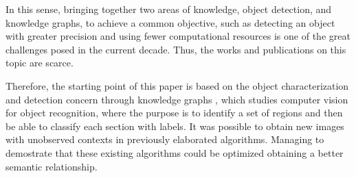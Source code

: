 In this sense, bringing together two areas of knowledge, object detection, and 
knowledge graphs, to achieve a common objective, such as detecting an object 
with greater precision and using fewer computational resources is one of the 
great challenges posed in the current decade. Thus, the works and 
publications on this topic are scarce.

Therefore, the starting point of this paper is based on the object 
characterization and detection concern through knowledge graphs \cite{Fang}, 
which studies computer vision for object recognition, where the purpose is 
to identify a set of regions and then be able to classify each section with 
labels. It was possible to obtain new images with unobserved contexts in 
previously elaborated algorithms. Managing to demostrate that these existing 
algorithms could be optimized obtaining a better semantic relationship.
